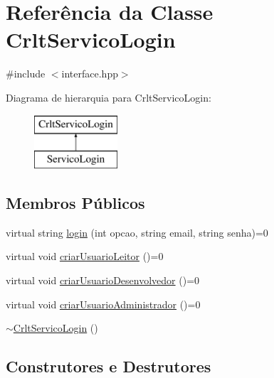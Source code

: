\hypertarget{class_crlt_servico_login}{}\section{Referência da Classe Crlt\+Servico\+Login}
\label{class_crlt_servico_login}


{\ttfamily \#include $<$interface.\+hpp$>$}

Diagrama de hierarquia para Crlt\+Servico\+Login\+:\begin{figure}[H]
\begin{center}
\leavevmode
\includegraphics[height=2.000000cm]{class_crlt_servico_login}
\end{center}
\end{figure}
\subsection*{Membros Públicos}
\begin{DoxyCompactItemize}
\item 
virtual string \mbox{\hyperlink{class_crlt_servico_login_a3a863ed6ef16279d0cdc1d33fd8f5edd}{login}} (int opcao, string email, string senha)=0
\item 
virtual void \mbox{\hyperlink{class_crlt_servico_login_ab5fdf7e56eb8edd6113386011f161085}{criar\+Usuario\+Leitor}} ()=0
\item 
virtual void \mbox{\hyperlink{class_crlt_servico_login_aab452ac1f3d0fd6d2f6989017026b188}{criar\+Usuario\+Desenvolvedor}} ()=0
\item 
virtual void \mbox{\hyperlink{class_crlt_servico_login_a49825818fa1e6e24495d6cb9e4236907}{criar\+Usuario\+Administrador}} ()=0
\item 
\mbox{\hyperlink{class_crlt_servico_login_af957954700a7d1743bf0593649023602}{$\sim$\+Crlt\+Servico\+Login}} ()
\end{DoxyCompactItemize}


\subsection{Construtores e Destrutores}
\mbox{\label{class_crlt_servico_login_af957954700a7d1743bf0593649023602}} 
